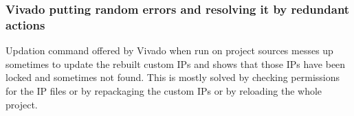 \subsubsection{Vivado putting random errors and resolving it by redundant actions}
Updation command offered by Vivado when run on project sources messes up sometimes to update the rebuilt custom IPs and shows that those IPs
have been locked and sometimes not found. This is mostly solved by checking permissions for the IP files or by repackaging the custom IPs or
by reloading the whole project.
